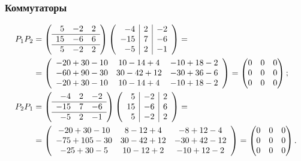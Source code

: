 \begin{solution}
	\subsubsection{Коммутаторы}
		\begin{align*}
			P_1 P_2 &=
			\left(
				\begin{array}{rrr}
					5 & -2 & 2
					\\
					\hline
					15 & -6 & 6
					\\
					\hline
					5 & -2 & 2
				\end{array}
			\right)
			\left(
				\begin{array}{r|r|r}
					-4 & 2 & -2
					\\
					-15 & 7 & -6
					\\
					-5 & 2 & -1
				\end{array}
			\right)
			= {} \\ {} &=
			\left(
				\begin{array}{ccc}
					-20 + 30 - 10 &
					10 - 14 + 4 &
					-10 + 18 - 2
					\\
					-60 + 90 - 30 &
					30 - 42 + 12 &
					-30 + 36 - 6
					\\
					-20 + 30 - 10 &
					10 - 14 + 4 &
					-10 + 18 - 2
				\end{array}
			\right)
			=
			\begin{pmatrix}
				0 & 0 & 0 \\
				0 & 0 & 0 \\
				0 & 0 & 0
			\end{pmatrix}
			;
			\\
			P_2 P_1 &=
			\left(
				\begin{array}{rrr}
					-4 & 2 & -2
					\\
					\hline
					-15 & 7 & -6
					\\
					\hline
					-5 & 2 & -1
				\end{array}
			\right)
			\left(
				\begin{array}{r|r|r}
					5 & -2 & 2
					\\
					15 & -6 & 6
					\\
					5 & -2 & 2
				\end{array}
			\right)
			= {} \\ {} &=
			\left(
				\begin{array}{ccc}
					-20 + 30 - 10 &
					8 - 12 + 4 &
					-8 + 12 - 4
					\\
					-75 + 105 - 30 &
					30 - 42 + 12 &
					-30 + 42 - 12
					\\
					-25 + 30 - 5 &
					10 - 12 + 2 &
					-10 + 12 - 2
				\end{array}
			\right)
			=
			\begin{pmatrix}
				0 & 0 & 0 \\
				0 & 0 & 0 \\
				0 & 0 & 0
			\end{pmatrix}
			.
		\end{align*}


\end{solution}

